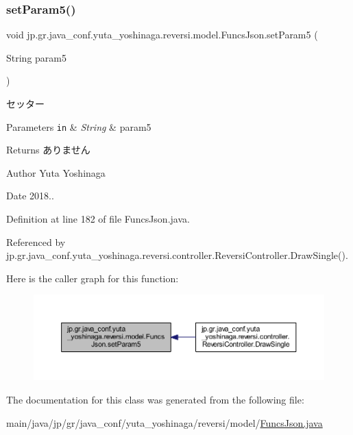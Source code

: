 \subsubsection{\texorpdfstring{set\+Param5()}{setParam5()}}
{\footnotesize\ttfamily void jp.\+gr.\+java\+\_\+conf.\+yuta\+\_\+yoshinaga.\+reversi.\+model.\+Funcs\+Json.\+set\+Param5 (\begin{DoxyParamCaption}\item[{String}]{param5 }\end{DoxyParamCaption})}



セッター 


\begin{DoxyParams}[1]{Parameters}
\mbox{\tt in}  & {\em String} & param5 \\
\hline
\end{DoxyParams}
\begin{DoxyReturn}{Returns}
ありません 
\end{DoxyReturn}
\begin{DoxyAuthor}{Author}
Yuta Yoshinaga 
\end{DoxyAuthor}
\begin{DoxyDate}{Date}
2018.. 
\end{DoxyDate}


Definition at line 182 of file Funcs\+Json.\+java.



Referenced by jp.\+gr.\+java\+\_\+conf.\+yuta\+\_\+yoshinaga.\+reversi.\+controller.\+Reversi\+Controller.\+Draw\+Single().

Here is the caller graph for this function\+:
\nopagebreak
\begin{figure}[H]
\begin{center}
\leavevmode
\includegraphics[width=350pt]{classjp_1_1gr_1_1java__conf_1_1yuta__yoshinaga_1_1reversi_1_1model_1_1_funcs_json_a020f9dc27e5d795a0554ee1fda117797_icgraph}
\end{center}
\end{figure}


The documentation for this class was generated from the following file\+:\begin{DoxyCompactItemize}
\item 
main/java/jp/gr/java\+\_\+conf/yuta\+\_\+yoshinaga/reversi/model/\hyperlink{_funcs_json_8java}{Funcs\+Json.\+java}\end{DoxyCompactItemize}
